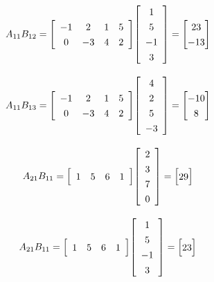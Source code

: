 \documentclass[addpoints]{exam}
\begin{document}
\begin{sloppypar}
\begin{questions}
\begin{solution}
        \[ A_{11}B_{12} = \renewcommand\arraystretch{1.3}
        \mleft[ 
        \begin{array}{cccc}
            -1 & 2 & 1 & 5 \\ 
            0 & -3 & 4 & 2
        \end{array}
        \mright] \renewcommand\arraystretch{1.3}
        \mleft[
        \begin{array}{c}
            1 \\ 5 \\ -1 \\ 3
        \end{array}
        \mright] = \begin{bmatrix}
            23 \\ -13 
        \end{bmatrix}\]

        \[ A_{11}B_{13} = \renewcommand\arraystretch{1.3}
        \mleft[ 
        \begin{array}{cccc}
            -1 & 2 & 1 & 5 \\ 
            0 & -3 & 4 & 2
        \end{array}
        \mright] \renewcommand\arraystretch{1.3}
        \mleft[
        \begin{array}{c}
            4 \\ 2 \\ 5 \\ -3
        \end{array}
        \mright] = \begin{bmatrix}
            -10 \\ 8
        \end{bmatrix}\]

        \[ A_{21}B_{11} = \renewcommand\arraystretch{1.3}
        \mleft[ 
        \begin{array}{cccc}
            1 & 5 & 6 & 1
        \end{array}
        \mright] \renewcommand\arraystretch{1.3}
        \mleft[
        \begin{array}{c}
            2 \\ 3 \\ 7 \\ 0
        \end{array}
        \mright] = \begin{bmatrix}
            29
        \end{bmatrix}\]

        \[ A_{21}B_{11} = \renewcommand\arraystretch{1.3}
        \mleft[ 
        \begin{array}{cccc}
            1 & 5 & 6 & 1
        \end{array}
        \mright] \renewcommand\arraystretch{1.3}
        \mleft[
        \begin{array}{c}
            1 \\ 5 \\ -1 \\ 3
        \end{array}
        \mright] = \begin{bmatrix}
            23
        \end{bmatrix}\]


\end{solution}
\end{questions}
\end{sloppypar}
\end{document}
